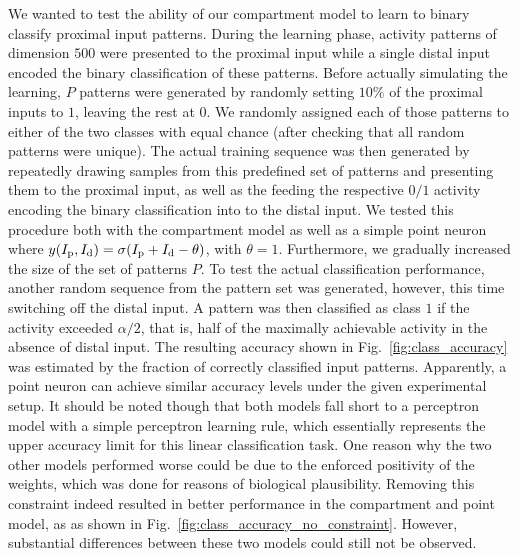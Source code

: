 \documentclass[10pt,a4paper]{article}
\begin{document}
We wanted to test the ability of our compartment model to learn to binary classify proximal input patterns. During the learning phase, activity patterns of dimension $500$ were presented to the proximal input while a single distal input encoded the binary classification of these patterns. Before actually simulating the learning, $P$ patterns were generated by randomly setting $10\%$ of the proximal inputs to $1$, leaving the rest at $0$. We randomly assigned each of those patterns to either of the two classes with equal chance (after checking that all random patterns were unique). The actual training sequence was then generated by repeatedly drawing samples from this predefined set of patterns and presenting them to the proximal input, as well as the feeding the respective $0/1$ activity encoding the binary classification into to the distal input. We tested this procedure both with the compartment model as well as a simple point neuron where $y(I_{\rm p},I_{\rm d}) = \sigma(I_{\rm p}+I_{\rm d} - \theta)$, with $\theta = 1$. Furthermore, we gradually increased the size of the set of patterns $P$. To test the actual classification performance, another random sequence from the pattern set was generated, however, this time switching off the distal input. A pattern was then classified as class $1$ if the activity exceeded $\alpha/2$, that is, half of the maximally achievable activity in the absence of distal input. The resulting accuracy shown in Fig.~\ref{fig:class_accuracy} was estimated by the fraction of correctly classified input patterns. Apparently, a point neuron can achieve similar accuracy levels under the given experimental setup. It should be noted though that both models fall short to a perceptron model with a simple perceptron learning rule, which essentially represents the upper accuracy limit for this linear classification task. One reason why the two other models performed worse could be due to the enforced positivity of the weights, which was done for reasons of biological plausibility. Removing this constraint indeed resulted in better performance in the compartment and point model, as as shown in Fig.~\ref{fig:class_accuracy_no_constraint}. However, substantial differences between these two models could still not be observed.
\end{document}
